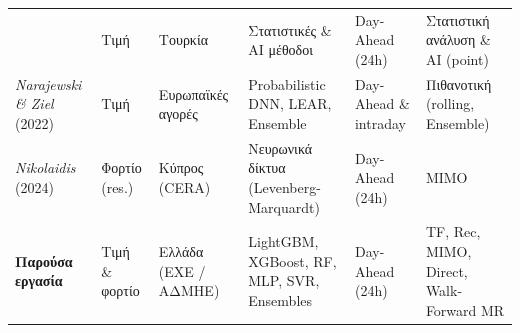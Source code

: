 \begin{landscape}
\begin{center}
\begin{tabular}{p{3.0cm}p{1.5cm}p{3.4cm}p{6.2cm}p{2.6cm}p{5.8cm}}
      & Τιμή & Τουρκία
      & Στατιστικές \& AI μέθοδοι
      & Day-Ahead (24h) & Στατιστική ανάλυση \& AI (point) \\
    \addlinespace[4pt]
    \textit{Narajewski \& Ziel} (2022)
      & Τιμή & Ευρωπαϊκές αγορές
      & Probabilistic DNN, LEAR, Ensemble
      & Day-Ahead \& intraday & Πιθανοτική (rolling, Ensemble) \\
    \addlinespace[4pt]
    \textit{Nikolaidis} (2024)
      & Φορτίο (res.) & Κύπρος (CERA)
      & Νευρωνικά δίκτυα (Levenberg-Marquardt)
      & Day-Ahead (24h) & MIMO \\
    \addlinespace[4pt]
    \midrule
    \textbf{Παρούσα εργασία}
      & Τιμή \& φορτίο & Ελλάδα (ΕΧΕ / ΑΔΜΗΕ)
      & LightGBM, XGBoost, RF, MLP, SVR, Ensembles
      & Day-Ahead (24h) & TF, Rec, MIMO, Direct, Walk-Forward MR \\
    \bottomrule
  \end{tabular}
  \label{tab:related_comparison}
\end{center}
\end{landscape}
